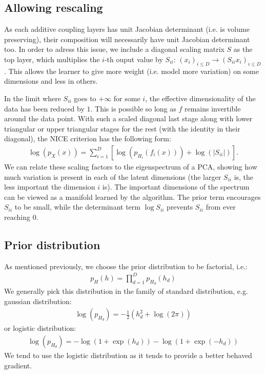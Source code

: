 \documentclass{article}
\begin{document}
\subsection{Allowing rescaling}
As each additive coupling layers has unit Jacobian determinant
(i.e. is volume preserving), their
composition will necessarily have unit Jacobian determinant too.
In order to adress this issue, we include
a diagonal scaling matrix $S$ as the top layer, which multiplies the
$i$-th ouput value by $S_{ii}$:
$(x_{i})_{i \leq D} \rightarrow (S_{ii}x_{i})_{i \leq D}$. This allows
the learner to give more weight (i.e. model more variation)
on some dimensions and less in others.

In the limit where $S_{ii}$ goes to $+\infty$ for some $i$,
the effective dimensionality of the data has been reduced by $1$. This is possible so long as
$f$ remains invertible around the data point. With such a scaled diagonal last stage along with lower triangular
or upper triangular stages for the rest (with the identity in their diagonal),
the NICE criterion has the following form:
\begin{align*}
\log(p_X(x)) = \sum_{i=1}^{D}{\left[\log(p_{H_{i}}(f_{i}(x))) + \log(\lvert S_{ii} \rvert)\right]}.
\end{align*}
We can relate these scaling factors to the eigenspectrum of a PCA, showing how much variation
is present in each of the latent dimensions
(the larger $S_{ii}$ is, the less important the dimension $i$ is).  
The important dimensions of the spectrum can be viewed as a manifold learned by the algorithm. 
The prior term encourages $S_{ii}$ to be small, while the determinant
term $\log S_{ii}$ prevents $S_{ii}$ from ever reaching $0$.

\subsection{Prior distribution}
As mentioned previously, we choose the prior distribution to be factorial,
i.e.:
\begin{align*}
p_H(h) = \prod_{d=1}^{D}{p_{H_{d}}(h_{d})}
\end{align*}
We generally pick this distribution in the family of standard distribution,
e.g. gaussian distribution:
\begin{align*}
\log(p_{H_{d}}) = -\frac{1}{2}(h_{d}^{2} + \log(2 \pi))
\end{align*}
or logistic distribution:
\begin{align*}
\log(p_{H_{d}}) = -\log(1 + \exp(h_d)) - \log(1 + \exp(-h_d))
\end{align*}
We tend to use the logistic distribution as it tends to provide a better
behaved gradient.
\end{document}
